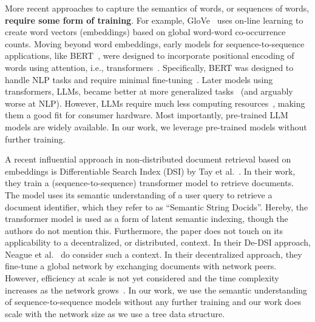 More recent approaches to capture the semantics of words, or sequences of words, \textbf{require some form of training}.
For example, GloVe~\cite{pennington2014glove} uses on-line learning to create word vectors (embeddings) based on global word-word co-occurrence counts.
Moving beyond word embeddings, early models for sequence-to-sequence applications, like BERT~\cite{kenton2019bert}, were designed to incorporate positional encoding of words using attention, i.e., transformers~\cite{vaswani2017attention}.
Specifically, BERT was designed to handle NLP tasks and require minimal fine-tuning~\cite{kenton2019bert}.
Later models using transformers, LLMs, became better at more generalized tasks~\cite{min2023recent} (and arguably worse at NLP).
However, LLMs require much less computing resources~\cite{rostam2024achieving}, making them a good fit for consumer hardware.
Most importantly, pre-trained LLM models are widely available.
In our work, we leverage pre-trained models without further training.

A recent influential approach in non-distributed document retrieval based on embeddings is Differentiable Search Index (DSI) by Tay et al.~\cite{tay2022transformer}.
In their work, they train a (sequence-to-sequence) transformer model to retrieve documents.
The model uses its semantic understanding of a user query to retrieve a document identifier, which they refer to as ``Semantic String Docids''.
Hereby, the transformer model is used as a form of latent semantic indexing, though the authors do not mention this.
Furthermore, the paper does not touch on its applicability to a decentralized, or distributed, context.
In their De-DSI approach, Neague et al.~\cite{neague2024dsi} do consider such a context.
In their decentralized approach, they fine-tune a global network by exchanging documents with network peers.
However, efficiency at scale is not yet considered and the time complexity increases as the network grows~\cite{neague2024dsi}.
In our work, we use the semantic understanding of sequence-to-sequence models without any further training and our work does scale with the network size as we use a tree data structure.



